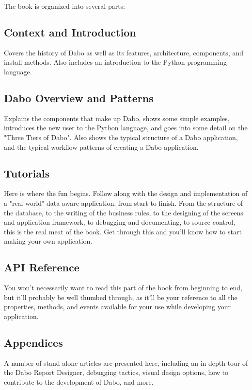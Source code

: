 The book is organized into several parts:

\subsection{Context and Introduction}

Covers the history of Dabo as well as its features, architecture, components, and 
install methods. Also includes an introduction to the Python programming language.

\subsection{Dabo Overview and Patterns}

Explains the components that make up Dabo, shows some simple examples, 
introduces the new user to the Python language, and goes into some detail on the 
"Three Tiers of Dabo". Also shows the typical structure of a Dabo application, and 
the typical workflow patterns of creating a Dabo application.

\subsection{Tutorials}

Here is where the fun begins. Follow along with the design and implementation of a 
"real-world" data-aware application, from start to finish. From the structure of the
database, to the writing of the business rules, to the designing of the screens and 
application framework, to debugging and documenting, to source control, this is the 
real meat of the book. Get through this and you'll know how to start making your 
own application.

\subsection{API Reference}

You won't necessarily want to read this part of the book from beginning to end, 
but it'll probably be well thumbed through, as it'll be your reference to all the 
properties, methods, and events available for your use while developing your 
application.

\subsection{Appendices}

A number of stand-alone articles are presented here, including an in-depth tour of 
the Dabo Report Designer, debugging tactics, visual design options, how to contribute 
to the development of Dabo, and more.
